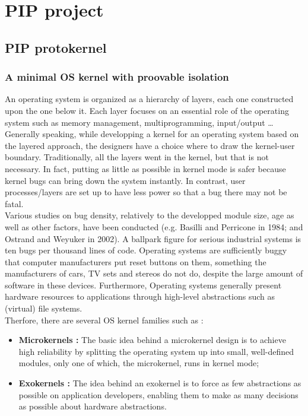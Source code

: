 \chapter{PIP project}

\section{PIP protokernel}

\subsection{A minimal OS kernel with proovable isolation} \label{PIP}
An operating system is organized as a hierarchy  of layers, each one constructed  upon  the one  below  it. Each layer focuses on an essential role of the operating system such as memory management, multiprogramming, input/output \dots Generally speaking, while developping a kernel for an operating system based on the  layered  approach,  the designers have a choice where to draw the kernel-user boundary. Traditionally, all the  layers  went in the  kernel, but that is not necessary. In fact, putting as little as possible in kernel mode is safer because kernel bugs can bring down the system instantly. In contrast, user processes/layers are set up to have less power so that a bug there may not be fatal.\\

Various studies on bug density, relatively to the developped module size, age as well as other factors, have been conducted (e.g.  Basilli  and  Perricone in 1984;  and Ostrand  and  Weyuker in 2002). A  ballpark  figure  for  serious industrial systems is ten  bugs per thousand  lines  of code. Operating  systems  are  sufficiently  buggy  that  computer  manufacturers  put  reset  buttons  on  them, something  the  manufacturers of cars, TV sets and stereos do  not do,  despite  the  large  amount  of software in these devices. Furthermore, Operating systems generally present hardware resources to applications through high-level abstractions such as (virtual) file systems.\\

\noindent Therfore, there are several OS kernel families such as : 
\begin{itemize}
	\item \textbf{Microkernels :} The basic idea  behind a microkernel design  is  to  achieve  high reliability  by  splitting  the  operating  system  up  into  small,  well-defined  modules,  only  one  of  which, the  microkernel, runs  in  kernel  mode;
	\item \textbf{Exokernels :} The idea behind an exokernel is to force as few abstractions as possible on application developers, enabling them to make as many decisions as possible about hardware abstractions.
\end{itemize} 
  
